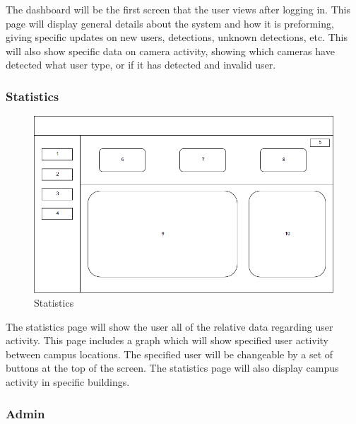 \documentclass[
  english,
  a4paper,
,tablecaptionabove
]{scrartcl}
\begin{document}
The dashboard will be the first screen that the user views after logging
in. This page will display general details about the system and how it
is preforming, giving specific updates on new users, detections, unknown
detections, etc. This will also show specific data on camera activity,
showing which cameras have detected what user type, or if it has
detected and invalid user.

\newpage

\hypertarget{statistics}{%
\subsubsection{Statistics}\label{statistics}}

\begin{figure}
\centering
\includegraphics{images/ppm-images/statistics-design.png}
\caption{Statistics}
\end{figure}

The statistics page will show the user all of the relative data
regarding user activity. This page includes a graph which will show
specified user activity between campus locations. The specified user
will be changeable by a set of buttons at the top of the screen. The
statistics page will also display campus activity in specific
buildings.\\
\newpage

\hypertarget{admin}{%
\subsubsection{Admin}\label{admin}}
\end{document}
